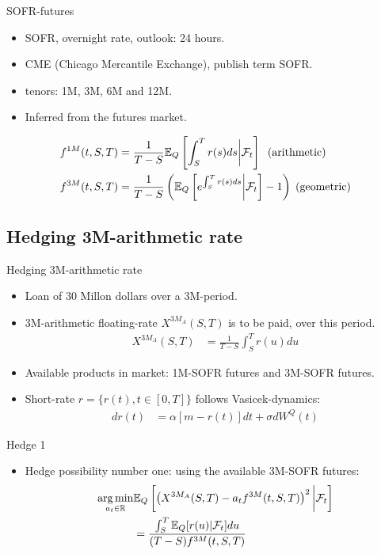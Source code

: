 \documentclass[UKenglish]{beamer}
\newcommand{\E}{\mathbb{E}}  %
\newcommand{\F}{\mathcal{F}} %
\newcommand{\R}{\mathbb{R}}  %
\begin{document}
\begin{frame}{SOFR-futures}
\begin{itemize}
    \item SOFR, overnight rate, outlook: 24 hours. 
    \item CME (Chicago Mercantile Exchange), publish term SOFR. 
    \item tenors: 1M, 3M, 6M and 12M. 
    \item Inferred from the futures market. 
\end{itemize}


\begin{definition}
\begin{align*}
f^{1M}(t,S,T) &= \frac{1}{T-S}\E_{Q}\left[
\int_{S}^{T}r(s)ds\bigg{|}\F_{t}
\right]\;\;(\text{arithmetic}) \\ 
f^{3M}(t,S,T) &= \frac{1}{T-S}\left(
\E_{Q}\left[
e^{\int_{S}^{T}r(s)ds}\bigg{|}\F_{t}
\right] - 1
\right)\;(\text{geometric})
\end{align*}    
\end{definition}
\end{frame}

\subsection{Hedging 3M-arithmetic rate}

\begin{frame}{Hedging 3M-arithmetic rate}
\begin{itemize}
    \item Loan of 30 Millon dollars over a 3M-period. 
    \item 3M-arithmetic floating-rate $X^{3M_{A}}(S,T)$ is to be paid, over this period. 
    \begin{align*}
    X^{3M_{A}}(S,T) &= \frac{1}{T-S}\int_{S}^{T}r(u)du
    \end{align*}
    \item Available products in market: 1M-SOFR futures and 3M-SOFR futures. 
    \item Short-rate $r = \{r(t), t\in [0,T]\}$ follows Vasicek-dynamics: 
    \begin{align*}
     dr(t) &= \alpha[m-r(t)]dt + \sigma dW^{Q}(t)   
    \end{align*}
\end{itemize}
\end{frame} 


\begin{frame}{Hedge 1}
\begin{itemize}
    \item Hedge possibility number one: using the available 3M-SOFR futures: 
\begin{align*}
\underset{a_{t}\in \R}{\arg\min}
&\E_{Q}\left[
\left(
X^{3M_{A}}(S,T)-a_{t}f^{3M}(t,S,T)
\right)^{2}
\bigg{|}\F_{t}
\right] \\ 
&= \frac{
\int_{S}^{T}\E_{Q}[r(u)|\F_{t}]du
}{
(T-S)f^{3M}(t,S,T)
}      
\end{align*}

\end{itemize}
\end{frame}
\end{document}
